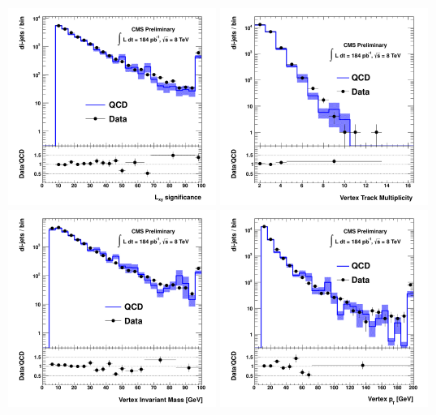 \begin{figure}[htbp]
\centering
\includegraphics[width=0.49\textwidth]{plots/control/ctrl_Lxysig.pdf}
\includegraphics[width=0.49\textwidth]{plots/control/ctrl_VtxN.pdf}\\
\includegraphics[width=0.49\textwidth]{plots/control/ctrl_Vtxmass.pdf}
\includegraphics[width=0.49\textwidth]{plots/control/ctrl_Vtxpt.pdf}\\

\end{figure}
